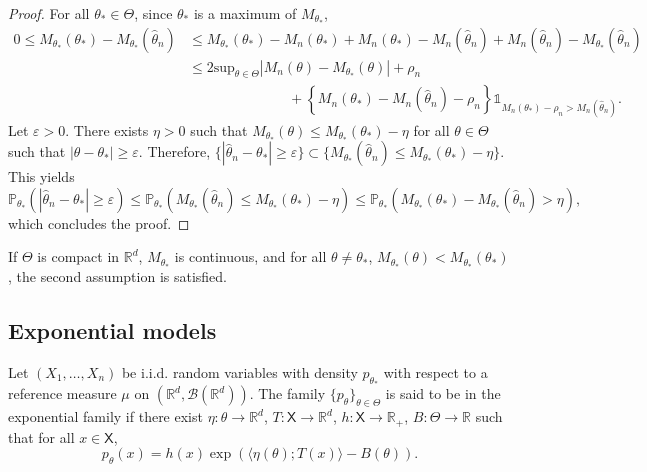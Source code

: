 \documentclass[english,graybox,envcountchap,envcountsame,sectrefs,shortlabels]{svmono}
\theoremstyle{style}
\newcommand{\eqsp}{}
\newcommand{\Xset}{\mathsf{X}}
\begin{document}
\begin{proof}
For all $\theta_*\in\Theta$, since $\theta_*$ is a maximum of $M_{\theta_*}$,
\begin{align*}
0\leq M_{\theta_*}(\theta_*) - M_{\theta_*}(\widehat\theta_n)&\leq  M_{\theta_*}(\theta_*) - M_n(\theta_*) + M_n(\theta_*) - M_n(\widehat\theta_n) + M_n(\widehat\theta_n) - M_{\theta_*}(\widehat\theta_n)\\
&\leq 2 \mathrm{sup}_{\theta\in\Theta}|M_n(\theta)-M_{\theta_*}(\theta)|+ \rho_n \\
&\hspace{3cm} + \left\{M_n(\theta_*)-M_n(\widehat \theta_n)-\rho_n\right\}\mathds{1}_{M_n(\theta_*) - \rho_n>M_n(\widehat \theta_n)}\eqsp.
\end{align*}
Let $\varepsilon>0$. There exists $\eta>0$ such that $M_{\theta_*}(\theta)\leq M_{\theta_*}(\theta_*)-\eta$ for all $\theta\in\Theta$ such that $|\theta-\theta_*|\geq \varepsilon$. Therefore, $\{|\widehat\theta_n-\theta_*|\geq \varepsilon\}\subset\{M_{\theta_*}(\widehat\theta_n)\leq M_{\theta_*}(\theta_*)-\eta\}$. This yields 
$$
\mathbb{P}_{\theta_*}\left(|\widehat\theta_n-\theta_*|\geq \varepsilon\right)\leq \mathbb{P}_{\theta_*}\left(M_{\theta_*}(\widehat\theta_n)\leq M_{\theta_*}(\theta_*)-\eta\right) \leq \mathbb{P}_{\theta_*}\left(M_{\theta_*}(\theta_*) - M_{\theta_*}(\widehat\theta_n)>\eta\right) \eqsp,
$$
which concludes the proof.
\end{proof}

\begin{remark}
If $\Theta$ is compact in $\mathbb{R}^d$, $M_{\theta_*}$ is continuous, and for all $\theta\neq\theta_*$, $M_{\theta_*}(\theta)<M_{\theta_*}(\theta_*)$, the second assumption is satisfied.
\end{remark}

\subsection*{Exponential models}
Let $(X_1,\ldots,X_n)$ be i.i.d. random variables with density $p_{\theta_*}$ with respect to a reference measure $\mu$ on $(\mathbb{R}^d,\mathcal{B}(\mathbb{R}^d))$. The family $\{p_\theta\}_{\theta\in\Theta}$ is said to be in the exponential family if there exist $\eta:\theta\to \mathbb{R}^d$, $T:\Xset\to\mathbb{R}^d$, $h:\Xset\to\mathbb{R}_+$, $B:\Theta\to\mathbb{R}$ such that for all $x\in\Xset$,
$$
p_\theta(x) = h(x)\exp\left(\langle \eta(\theta);T(x)\rangle - B(\theta)\right)\eqsp.
$$
\end{document}
